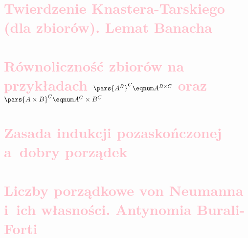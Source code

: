 \section{\textcolor{pink}{Twierdzenie Knastera-Tarskiego (dla zbiorów). Lemat Banacha}}
\label{mfi:knaster_tarski_and_banach}


\section{\textcolor{pink}{Równoliczność zbiorów na przykładach \texorpdfstring{\(\pars{A^B}^C \eqnum A^{B \times C}\)}{(A\^B)\^C ~ A\^(B x C)} oraz \texorpdfstring{\(\pars{A \times B}^C \eqnum A^C \times B^C\)}{(A x B)\^C ~ A\^C x B\^C}}}
\label{mfi:equinumerosity}


\section{\textcolor{pink}{Zasada indukcji pozaskończonej a~dobry porządek}}

\section{\textcolor{pink}{Liczby porządkowe von Neumanna i~ich własności. Antynomia Burali-Forti}}
